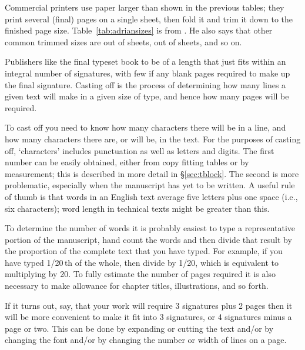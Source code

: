 \documentclass[10pt,a4paper,oneside,extrafontsizes]{memoir}%
\begin{document}
\begin{paracol}{2}
\switchEng
    Commercial printers use paper larger than shown in the previous tables;
they print several (final) pages on a single sheet, then fold it and trim it
down to the finished page size. Table~\ref{tab:adriansizes} is from
\autocite[p. 59]{ADRIANWILSON93}. He also says that other common trimmed sizes are
 out of  sheets, 
 out of  sheets, and so on.

\newpage


    Publishers like the final typeset book to be of a length that just fits
within an integral number of signatures, 
with few if any blank pages required
to make up the final signature. Casting off is the
process of determining how many lines a given text will make in a given
size of type, and hence how many pages will be required.

    To cast off you need to know how many characters there will be in
a line, and how many characters there are, or will be, in the text. 
For the purposes of casting off, `characters' includes punctuation as well
as letters and digits. The
first number can be easily obtained, either from copy fitting tables or
by measurement; this is described in more detail in \S\ref{sec:tblock}.
The second is more problematic, especially when the manuscript has yet
to be written. A useful rule of thumb is that words in an English text
average five letters plus one space (i.e., six characters); 
word length in technical texts might be greater than this.

    To determine the number of words it is probably easiest to type a
representative portion of the manuscript, hand count the words and then
divide that result by the proportion of the complete text that you have
typed. For example, if you have typed 1/20\,th of the whole, then divide
by 1/20, which is equivalent to multiplying by 20. To fully estimate
the number of pages required it is also necessary to make allowance for
chapter titles, illustrations, and so forth.

    If it turns out, say, that your work will require 3 signatures plus 2
pages then it will be more convenient to make it fit into 3 signatures,
or 4 signatures minus a page or two. This can be done by expanding or cutting
the text and/or by changing the font 
and/or by changing the number or width
of lines on a page.


\end{paracol}
\end{document}
